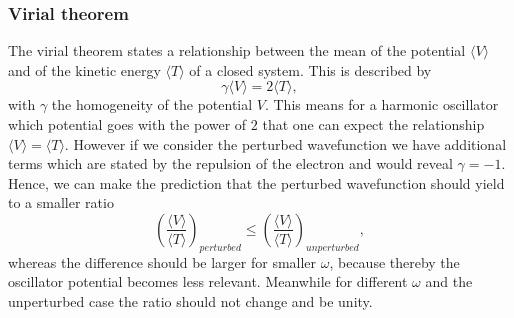 \subsubsection{Virial theorem}
The virial theorem states a relationship between the mean of the potential $\langle V \rangle$ and of the kinetic energy $\langle T \rangle$ of a closed system. This is described by
\begin{equation}
    \gamma \langle V \rangle = 2 \langle T \rangle,
\end{equation}
with $\gamma$ the homogeneity of the potential $V$. This means for a harmonic oscillator which potential goes with the power of $2$ that one can expect the relationship $\langle V \rangle = \langle T \rangle$. However if we consider the perturbed wavefunction we have additional terms which are stated by the repulsion of the electron and would reveal $\gamma = -1$. Hence, we can make the prediction that the perturbed wavefunction should yield to a smaller ratio 
\begin{equation}
\left(\frac{\langle V \rangle}{\langle T \rangle}\right)_{perturbed} \leq \left(\frac{\langle V \rangle}{\langle T \rangle}\right)_{unperturbed},
\end{equation}
whereas the difference should be larger for smaller $\omega$, because thereby the oscillator potential becomes less relevant. Meanwhile for different $\omega$ and the unperturbed case the ratio should not change and be unity.

